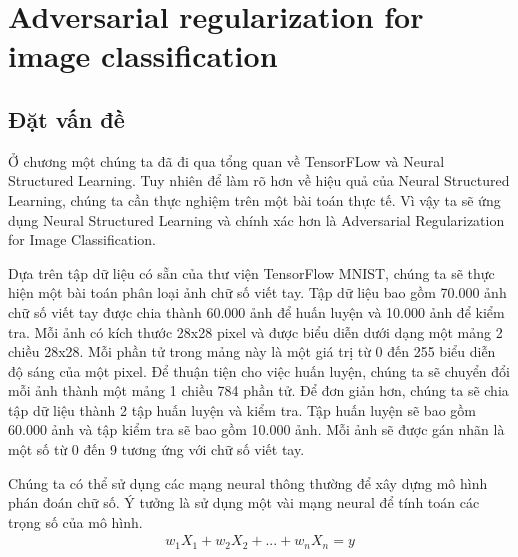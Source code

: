 
\chapter{Adversarial regularization for image classification} %

\label{Chapter2} %


\section{Đặt vấn đề}

Ở chương một chúng ta đã đi qua tổng quan về TensorFLow và Neural Structured Learning. Tuy nhiên để làm rõ hơn về hiệu quả của Neural
Structured Learning, chúng ta cần thực nghiệm trên một bài toán thực tế. Vì vậy ta sẽ ứng dụng Neural Structured Learning và chính xác hơn là Adversarial 
Regularization for Image Classification.

Dựa trên tập dữ liệu có sẵn của thư viện TensorFlow MNIST, chúng ta sẽ thực hiện một bài toán phân loại ảnh chữ số viết tay. Tập dữ liệu bao gồm 70.000 ảnh
chữ số viết tay được chia thành 60.000 ảnh để huấn luyện và 10.000 ảnh để kiểm tra. Mỗi ảnh có kích thước 28x28 pixel và được biểu diễn dưới dạng một mảng
2 chiều 28x28. Mỗi phần tử trong mảng này là một giá trị từ 0 đến 255 biểu diễn độ sáng của một pixel. Để thuận tiện cho việc huấn luyện, chúng ta sẽ chuyển đổi
mỗi ảnh thành một mảng 1 chiều 784 phần tử. Để đơn giản hơn, chúng ta sẽ chia tập dữ liệu thành 2 tập huấn luyện và kiểm tra. Tập huấn luyện sẽ bao gồm 60.000 ảnh 
và tập kiểm tra sẽ bao gồm 10.000 ảnh. Mỗi ảnh sẽ được gán nhãn là một số từ 0 đến 9 tương ứng với chữ số viết tay. 

Chúng ta có thể sử dụng các mạng neural thông thường để xây dựng mô hình phán đoán chữ số. Ý tưởng là sử dụng một vài mạng neural để tính toán các trọng số
của mô hình. 
\begin{equation}
    \begin{aligned}  
      w_1X_1 + w_2X_2 + ... + w_nX_n = y\\
    \end{aligned}
\end{equation}

